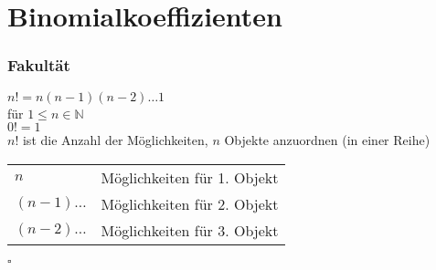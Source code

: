 \section{Binomialkoeffizienten}

%
%
%

\subsubsection{Fakultät}
$n! = n(n-1)(n-2)\dots1$\\
für $1\leq n\in\mathbb{N}$\\
$0!=1$\\

%
%
%

\stz
$n!$ ist die Anzahl der Möglichkeiten, $n$ Objekte anzuordnen (in einer Reihe)\\

%
%
%

\bws 

 \begin{tabular}{ll}
$n$  & Möglichkeiten für 1. Objekt \\
$(n-1)\dots$ & Möglichkeiten für 2. Objekt \\
$(n-2)\dots$ & Möglichkeiten für 3. Objekt\\
 \end{tabular}

$\square$